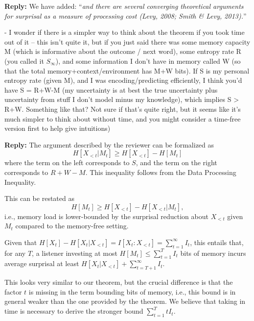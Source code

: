 \documentclass{article}[11pt,a4paper,oneside]
\newenvironment{reply}
  {\par\medskip
   \color{blue}%
   \begin{framed}
   \textbf{Reply: }\ignorespaces}
 {\end{framed}
  \medskip}
\begin{document}
\begin{reply}
	We have added: ``\textit{and there are several converging theoretical arguments for surprisal as a measure of processing cost (Levy, 2008; Smith \& Levy, 2013).}''
\end{reply}

- I wonder if there is a simpler way to think about the theorem if you took time out of it -- this isn't quite it, but if you just said there was some memory capacity M (which is informative about the outcome / next word), some entropy rate R (you called it $S_\infty$), and some information I don't have in memory called W (so that the total memory+context/environment has M+W bits). If S is my personal entropy rate (given M), and I was encoding/predicting efficiently, I think you'd have S = R+W-M (my uncertainty is at best the true uncertainty plus uncertainty from stuff I don't model minus my knowledge), which implies S > R+W. Something like that? Not sure if that's quite right, but it seems like it's much simpler to think about without time, and you might consider a time-free version first to help give intuitions)

\begin{reply}
The argument described by the reviewer can be formalized as
\begin{equation}
H[X_{<t}|M_t] \geq H[X_{<t}] - H[M_t]
\end{equation}
where the term on the left corresponds to $S$, and the term on the right corresponds to $R+W-M$.
This inequality follows from the Data Processing Inequality.

This can be restated as 
\begin{equation}
H[M_t] \geq H[X_{<t}] - H[X_{<t}|M_t],
\end{equation}
i.e., memory load is lower-bounded by the surprisal reduction about $X_{<t}$ given $M_t$ compared to the memory-free setting.

Given that $H[X_t] - H[X_t|X_{<t}] = I[X_t:X_{<t}] = \sum_{t=1}^\infty I_t$, this entails that, for any $T$, a listener investing at most $H[M_t] \leq \sum_{t=1}^T I_t$ bits of memory incurs average surprisal at least $H[X_t|X_{<t}] + \sum_{t=T+1}^\infty I_t$.

This looks very similar to our theorem, but the crucial difference is that the factor $t$ is missing in the term bounding bits of memory, i.e., this bound is in general weaker than the one provided by the theorem.
	We believe that taking in time is necessary to derive the stronger bound $\sum_{t=1}^T t I_t$.
\end{reply}
\end{document}
